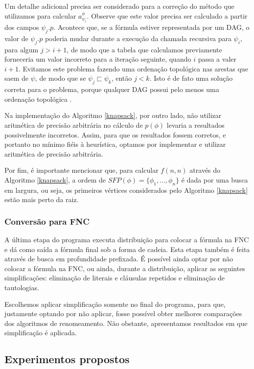 Um detalhe adicional precisa ser considerado para a correção do método que utilizamos para calcular $a_{\psi_i}^\phi$. Observe que este valor precisa ser calculado a partir dos campos $\psi_j.p$. Acontece que, se a fórmula estiver representada por um DAG, o valor de $\psi_j.p$ poderia mudar durante a execução da chamada recursiva para $\psi_i$, para algum $j > i+1$, de modo que a tabela que calculamos previamente forneceria um valor incorreto para a iteração seguinte, quando $i$ passa a valer $i+1$. Evitamos este problema fazendo uma ordenação topológica nas arestas que saem de $\psi$, de modo que se $\psi_j \sqsubset \psi_k$, então $j < k$. Isto é de fato uma solução correta para o problema, porque qualquer DAG possui pelo menos uma ordenação topológica \cite{CLRS09}.

Na implementação do Algoritmo \ref{knapsack}, por outro lado, não utilizar aritmética de precisão arbitrária no cálculo de $p(\phi)$ levaria a resultados possivelmente incorretos. Assim, para que os resultados fossem corretos, e portanto no mínimo fiéis à heurística, optamos por implementar e utilizar aritmética de precisão arbitrária.

Por fim, é importante mencionar que, para calcular $f(n,n)$ através do Algoritmo \ref{knapsack}, a ordem de $SFP(\phi) = \{\phi_1,...,\phi_n \}$ é dada por uma busca em largura, ou seja, os primeiros vértices considerados pelo Algoritmo \ref{knapsack} estão mais perto da raiz.

\subsubsection{Conversão para FNC}

\indent

A última etapa do programa executa distribuição para colocar a fórmula na FNC e dá como saída a fórmula final sob a forma de cadeia. Esta etapa também é feita através de busca em profundidade prefixada. É possível ainda optar por não colocar a fórmula na FNC, ou ainda, durante a distribuição, aplicar as seguintes simplificações: eliminação de literais e cláusulas repetidos e eliminação de tautologias.

Escolhemos aplicar simplificação somente no final do programa, para que, justamente optando por não aplicar, fosse possível obter melhores comparações dos algoritmos de renomeamento. Não obstante, apresentamos resultados em que simplificação é aplicada.

\subsection{Experimentos propostos}


